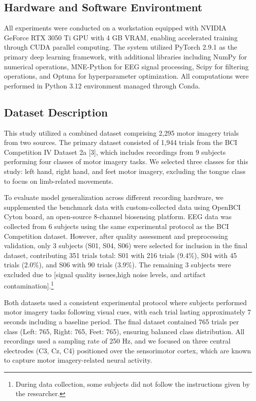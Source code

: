 \subsection{Hardware and Software Environtment}
All experiments were conducted on a workstation equipped with NVIDIA GeForce RTX 3050 Ti GPU with 4 GB VRAM, enabling accelerated training through CUDA parallel computing. The system utilized PyTorch 2.9.1 as the primary deep learning framework, with additional libraries including NumPy for numerical operations, MNE-Python for EEG signal processing, Scipy for filtering operations, and Optuna for hyperparameter optimization. All computations were performed in Python 3.12 environment managed through Conda.

\subsection{Dataset Description}

This study utilized a combined dataset comprising 2,295 motor imagery trials from two sources. The primary dataset consisted of 1,944 trials from the BCI Competition IV Dataset 2a [3], which includes recordings from 9 subjects performing four classes of motor imagery tasks. We selected three classes for this study: left hand, right hand, and feet motor imagery, excluding the tongue class to focus on limb-related movements.

To evaluate model generalization across different recording hardware, we supplemented the benchmark data with custom-collected data using OpenBCI Cyton board, an open-source 8-channel biosensing platform. EEG data was collected from 6 subjects using the same experimental protocol as the BCI Competition dataset. However, after quality assessment and preprocessing validation, only 3 subjects (S01, S04, S06) were selected for inclusion in the final dataset, contributing 351 trials total: S01 with 216 trials (9.4\%), S04 with 45 trials (2.0\%), and S06 with 90 trials (3.9\%). The remaining 3 subjects were excluded due to [signal quality issues,high noise levels, and artifact contamination].\footnote{During data collection, some subjects did not follow the instructions given by the researcher. }

Both datasets used a consistent experimental protocol where subjects performed motor imagery tasks following visual cues, with each trial lasting approximately 7 seconds including a baseline period. The final dataset contained 765 trials per class (Left: 765, Right: 765, Feet: 765), ensuring balanced class distribution. All recordings used a sampling rate of 250 Hz, and we focused on three central electrodes (C3, Cz, C4) positioned over the sensorimotor cortex, which are known to capture motor imagery-related neural activity.

